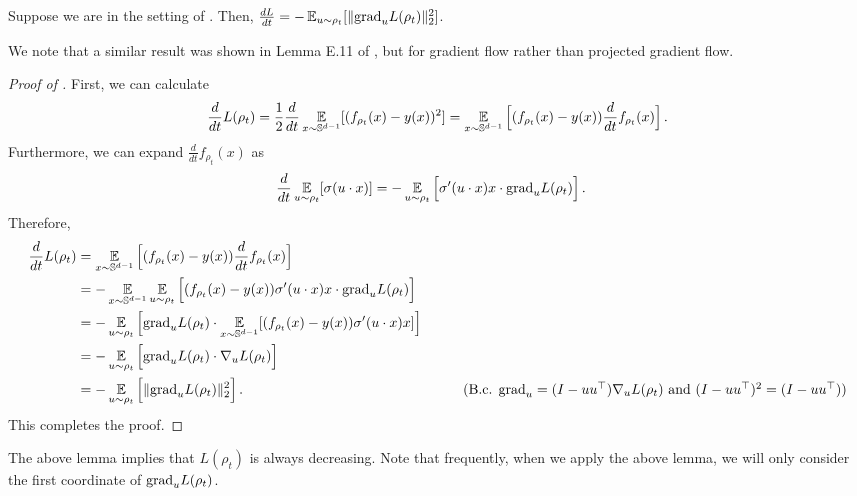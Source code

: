 \begin{lemma} \label{lemma:loss_decrease}
Suppose we are in the setting of . Then, $\frac{dL}{dt} = -\operatorname*{\mathbb{E}}_{u \sim \rho_t} [\| {\textup{grad}}_{u} L(\rho_t)\|_2^2]$.
\end{lemma}

We note that a similar result was shown in Lemma E.11 of \citet{WLLM19_generalization_matters}, but for gradient flow rather than projected gradient flow.

\begin{proof}[Proof of ]
First, we can calculate
\begin{align}
\frac{d}{dt} L(\rho_t) 
= \frac{1}{2} \frac{d}{dt} \operatorname*{\mathbb{E}}_{x \sim \mathbb{S}^{d - 1}} [(f_{\rho_t}(x) - y(x))^2] 
= \operatorname*{\mathbb{E}}_{x \sim \mathbb{S}^{d - 1}} \Big[ (f_{\rho_t}(x) - y(x)) \frac{d}{dt} f_{\rho_t}(x) \Big] \,.
\end{align}
Furthermore, we can expand $\frac{d}{dt} f_{\rho_t}(x)$ as
\begin{align}
\frac{d}{dt} \operatorname*{\mathbb{E}}_{u \sim \rho_t} [\sigma(u \cdot x)]
& = -\operatorname*{\mathbb{E}}_{u \sim \rho_t} \Big[ \sigma'(u \cdot x) x \cdot {\textup{grad}}_u L(\rho_t) \Big] \,.
\end{align}
Therefore,
\begin{align}
\frac{d}{dt} L(\rho_t)
& = \E_{x \sim \bbS^{d - 1}} \Big[ (f_{\rho_t}(x) - y(x)) \frac{d}{dt} f_{\rho_t}(x) \Big] \\
& = -\E_{x \sim \bbS^{d - 1}} \E_{\u \sim \rho_t} \Big[(f_{\rho_t}(x) - y(x)) \sigma'(\u \cdot x) x \cdot \pgrad_\u L(\rho_t) \Big] \\
& = -\E_{\u \sim \rho_t} \Big[ \pgrad_\u L(\rho_t) \cdot \E_{x \sim \bbS^{d - 1}} [(f_{\rho_t}(x) - y(x)) \sigma'(\u \cdot x) x]  \Big] \\
& = - \E_{\u \sim \rho_t} \Big[\pgrad_\u L(\rho_t) \cdot \nabla_\u L(\rho_t) \Big] \\
& = -\E_{\u \sim \rho_t} \Big[\|\pgrad_\u L(\rho_t)\|_2^2 \Big] \period
& \tag{B.c. $\pgrad_\u = (I - \u\u^\top) \nabla_\u L(\rho_t)$ and $(I - \u\u^\top)^2 = (I - \u\u^\top)$}
\end{align}
This completes the proof.
\end{proof}

The above lemma implies that $L(\rho_t)$ is always decreasing. Note that frequently, when we apply the above lemma, we will only consider the first coordinate of ${\textup{grad}}_u L(\rho_t)$.


